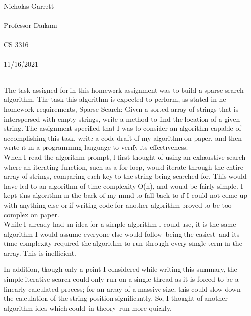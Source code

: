 \documentclass[12pt, a4paper]{article}
\begin{document}
\noindent
Nicholas Garrett\\ \\
Professor Dailami\\ \\
CS 3316\\ \\
11/16/2021\\ \\

\begin{center}
\end{center}


The task assigned for in this homework assignment was to build a sparse search algorithm.  The task this algorithm is expected to perform, as stated in he homework requirements, Sparse Search: Given a sorted array of strings that is interspersed with empty strings, write a method to find the location of a given string.  The assignment specified that I was to consider an algorithm capable of accomplishing this task, write a code draft of my algorithm on paper, and then write it in a programming language to verify its effectiveness.\\

When I read the algorithm prompt, I first thought of using an exhaustive search where an iterating function, such as a for loop, would iterate through the entire array of strings, comparing each key to the string being searched for.  This would have led to an algorithm of time complexity O(n), and would be fairly simple.  I kept this algorithm in the back of my mind to fall back to if I could not come up with anything else or if writing code for another algorithm proved to be too complex on paper.  \\

While I already had an idea for a simple algorithm I could use, it is the same algorithm I would assume everyone else would follow--being the easiest--and its time complexity required the algorithm to run through every single term in the array.  This is inefficient.  

In addition, though only a point I considered while writing this summary, the simple iterative search could only run on a single thread as it is forced to be a linearly calculated process; for an array of a massive size, this could slow down the calculation of the string position significantly.  So, I thought of another algorithm idea which could--in theory--run more quickly.\\
\end{document}
